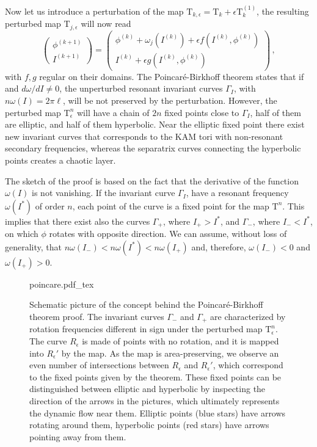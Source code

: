 Now let us introduce a perturbation of the map $\mathrm{T}_{k,\epsilon} = \mathrm{T}_k + \epsilon \mathrm{T}^{(1)}_k$, the resulting perturbed map $\mathrm{T}_{j,\epsilon}$ will now read
\begingroup
\renewcommand*{\arraystretch}{1.5}
\begin{equation}
	\begin{pmatrix} \phi^{(k+1)} \\ I^{(k+1)} \end{pmatrix}  = \begin{pmatrix} \phi^{(k)} + \omega_j\left(I^{(k)}\right) + \epsilon f(I^{(k)}, \phi^{(k)}) \\ I^{(k)}  + \epsilon g(I^{(k)}, \phi^{(k)}) \end{pmatrix} \, ,
    \label{eq:area_perturbed_map}
\end{equation}
\endgroup
with $f, g$ regular on their domains. The Poincaré-Birkhoff theorem states that if and $d\omega/dI\ne 0$, the unperturbed resonant invariant curves $\Gamma_I$, with $n\omega(I)=2\pi \ell$, will be not preserved by the perturbation. However, the perturbed map $\mathrm{T}^n_{\epsilon}$ will have a chain of $2n$ fixed points close to $\Gamma_I$, half of them are elliptic, and half of them hyperbolic. Near the elliptic fixed point there exist new invariant curves that corresponds to the KAM tori with non-resonant secondary frequencies, whereas the separatrix curves connecting the hyperbolic points creates a chaotic layer.

The sketch of the proof is based on the fact that the derivative of the function $\omega(I)$ is not vanishing.  If the invariant curve $\Gamma_{I}$, have a resonant frequency $\omega(I^*)$ of order $n$, each point of the curve is a fixed point for the map $\mathrm{T}^n$. This implies that there exist also the curves $\Gamma_+$, where $I_+>I^*$, and $\Gamma_-$, where $I_-<I^*$, on which $\phi$ rotates with opposite direction. We can assume, without loss of generality, that $n\omega(I_-)<n\omega(I^*)<n\omega(I_+)$ and, therefore, $\omega(I_-)<0$ and $\omega(I_+)>0$.

\begin{figure}[t]
	\centering
	\def\svgwidth{0.75\columnwidth}
    {poincare.pdf_tex}
    \caption{Schematic picture of the concept behind the Poincaré-Birkhoff theorem proof. The invariant curves $\Gamma_-$ and $\Gamma_+$ are characterized by rotation frequencies different in sign under the perturbed map $\mathrm{T}^n_{\epsilon}$. The curve $R_\epsilon$ is made of points with no rotation, and it is mapped into $R_\epsilon'$ by the map. As the map is area-preserving, we observe an even number of intersections between $R_\epsilon$ and $R_\epsilon'$, which correspond to the fixed points given by the theorem. These fixed points can be distinguished between elliptic and hyperbolic by inspecting the direction of the arrows in the pictures, which ultimately represents the dynamic flow near them. Elliptic points (blue stars) have arrows rotating around them, hyperbolic points (red stars) have arrows pointing away from them.}
    \label{fig:tnepsilon}
\end{figure}

